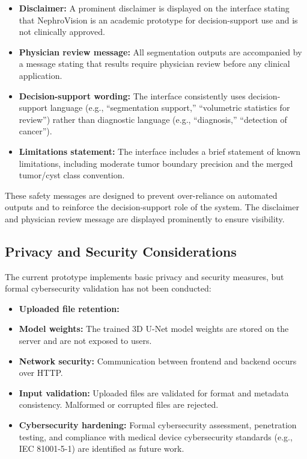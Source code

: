 \begin{itemize}
    \item \textbf{Disclaimer:} A prominent disclaimer is displayed on the interface stating that NephroVision is an academic prototype for decision-support use and is not clinically approved.
    \item \textbf{Physician review message:} All segmentation outputs are accompanied by a message stating that results require physician review before any clinical application.
    \item \textbf{Decision-support wording:} The interface consistently uses decision-support language (e.g., ``segmentation support,'' ``volumetric statistics for review'') rather than diagnostic language (e.g., ``diagnosis,'' ``detection of cancer'').
    \item \textbf{Limitations statement:} The interface includes a brief statement of known limitations, including moderate tumor boundary precision and the merged tumor/cyst class convention.
\end{itemize}

These safety messages are designed to prevent over-reliance on automated outputs and to reinforce the decision-support role of the system. The disclaimer and physician review message are displayed prominently to ensure visibility.

\subsection{Privacy and Security Considerations}

The current prototype implements basic privacy and security measures, but formal cybersecurity validation has not been conducted:

\begin{itemize}
    \item \textbf{Uploaded file retention:} %
    \item \textbf{Model weights:} The trained 3D U-Net model weights are stored on the server and are not exposed to users. %
    \item \textbf{Network security:} Communication between frontend and backend occurs over HTTP. %
    \item \textbf{Input validation:} Uploaded files are validated for format and metadata consistency. Malformed or corrupted files are rejected. %
    \item \textbf{Cybersecurity hardening:} Formal cybersecurity assessment, penetration testing, and compliance with medical device cybersecurity standards (e.g., IEC 81001-5-1) are identified as future work.
\end{itemize}

